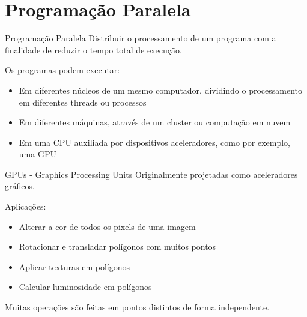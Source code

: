 \documentclass{beamer}
\begin{document}
\section{Programação Paralela}

\begin{frame}{Programação Paralela}
Distribuir o processamento de um programa com a finalidade de reduzir o tempo total de execução.

Os programas podem executar:
\begin{itemize}
    \item Em diferentes núcleos de um mesmo computador, dividindo o processamento em diferentes threads ou processos
    \item Em diferentes máquinas, através de um cluster ou computação em nuvem
    \item Em uma CPU auxiliada por dispositivos aceleradores, como por exemplo, uma GPU
\end{itemize}
\end{frame}

\begin{frame}{GPUs - Graphics Processing Units}
Originalmente projetadas como aceleradores gráficos.

Aplicações:
\begin{itemize}
    \item Alterar a cor de todos os pixels de uma imagem
    \item Rotacionar e transladar polígonos com muitos pontos
    \item Aplicar texturas em polígonos
    \item Calcular luminosidade em polígonos
\end{itemize}
Muitas operações são feitas em pontos distintos de forma independente.
\end{frame}
\end{document}
